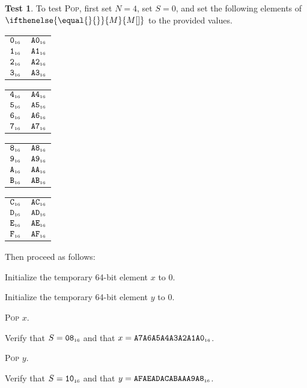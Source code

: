 \documentclass[a4paper,12pt]{article}
\makeatletter
\newcommand{\num}[1]{\texttt{#1}}
\newcommand{\hex}[1]{\num{#1}_{\textup{\tiny 16}}}
\newcommand{\MEM}[1]{\ifthenelse{\equal{#1}{}}{M}{M[#1]}}
\newcommand{\SP}{S}
\newcommand{\proc}[1]{\textsc{#1}}
\theoremstyle{definition}
\newtheorem{test}{Test}
\newenvironment{memtable}{%
  \begin{trivlist}
    \item
    }{%
    \end{trivlist}}
\newenvironment{memcolumn}{%
  \begin{tabular}{@{}ll@{}}
    \hline}
    {%
    \hline
  \end{tabular}}
\newcommand{\memspace}{\qquad}
\makeatother
\begin{document}
\begin{test}
  To test \proc{Pop}, first set $N=4$, set $S=0$, and set the following elements of $\MEM{}$ to the provided values.
  \begin{memtable}
    \begin{memcolumn}
      $\hex{0}$ & $\hex{A0}$ \\
      $\hex{1}$ & $\hex{A1}$ \\
      $\hex{2}$ & $\hex{A2}$ \\
      $\hex{3}$ & $\hex{A3}$ \\
    \end{memcolumn}
    \memspace
    \begin{memcolumn}
      $\hex{4}$ & $\hex{A4}$ \\
      $\hex{5}$ & $\hex{A5}$ \\
      $\hex{6}$ & $\hex{A6}$ \\
      $\hex{7}$ & $\hex{A7}$ \\
    \end{memcolumn}
    \memspace
    \begin{memcolumn}
      $\hex{8}$ & $\hex{A8}$ \\
      $\hex{9}$ & $\hex{A9}$ \\
      $\hex{A}$ & $\hex{AA}$ \\
      $\hex{B}$ & $\hex{AB}$ \\
    \end{memcolumn}
    \memspace
    \begin{memcolumn}
      $\hex{C}$ & $\hex{AC}$ \\
      $\hex{D}$ & $\hex{AD}$ \\
      $\hex{E}$ & $\hex{AE}$ \\
      $\hex{F}$ & $\hex{AF}$ \\
    \end{memcolumn}
  \end{memtable}
  Then proceed as follows:
  \begin{stepnumbers}
  \item Initialize the temporary 64-bit element $x$ to $0$.
  \item Initialize the temporary 64-bit element $y$ to $0$.
  \item \proc{Pop} $x$.
  \item Verify that $\SP = \hex{08}$ and that $x = \hex{A7A6A5A4A3A2A1A0}$.
  \item \proc{Pop} $y$.
  \item Verify that $\SP = \hex{10}$ and that $y = \hex{AFAEADACABAAA9A8}$.
  \end{stepnumbers}
\end{test}
\end{document}
